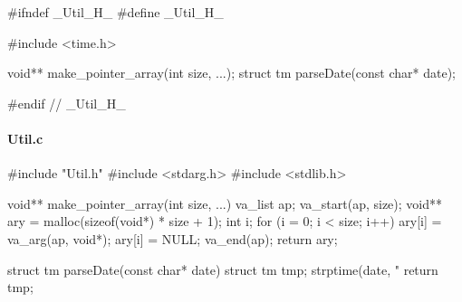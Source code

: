 \documentclass[submission]{eptcs}
\begin{document}
\begin{ccode}
#ifndef _Util_H_
#define _Util_H_

#include <time.h>

void** make_pointer_array(int size, ...);
struct tm parseDate(const char* date);

#endif // _Util_H_
\end{ccode}

\paragraph{Util.c}

\begin{ccode}
#include "Util.h"
#include <stdarg.h>
#include <stdlib.h>

void** make_pointer_array(int size, ...) {
  va_list ap;
  va_start(ap, size);
  void** ary = malloc(sizeof(void*) * size + 1);
  int i;
  for (i = 0; i < size; i++) {
    ary[i] = va_arg(ap, void*);
  }
  ary[i] = NULL;
  va_end(ap);
  return ary;
}

struct tm parseDate(const char* date) {
  struct tm tmp;
  strptime(date, "%
  return tmp;
}
\end{ccode}
\end{document}
